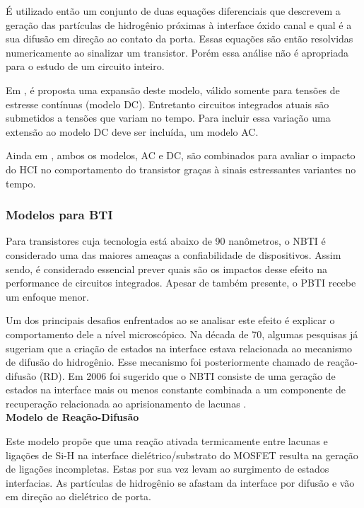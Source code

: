 É utilizado então um conjunto de duas equações diferenciais que descrevem a geração das partículas de hidrogênio próximas à interface óxido canal e qual é a sua difusão em direção ao contato da porta. Essas equações são então resolvidas numericamente ao sinalizar um transistor. Porém essa análise não é apropriada para o estudo de um circuito inteiro.

Em \cite{Maricau2013}, é proposta uma expansão deste modelo, válido somente para tensões de estresse contínuas (modelo DC). Entretanto circuitos integrados atuais são submetidos a tensões que variam no tempo. Para incluir essa variação uma extensão ao modelo DC deve ser incluída, um modelo AC. 

Ainda em \cite{Maricau2013}, ambos os modelos, AC e DC, são combinados para avaliar o impacto do HCI no comportamento do transistor graças à sinais estressantes variantes no tempo.

\subsubsection{Modelos para BTI}
\label{subsubsection_Modelos_BTI}

Para  transistores cuja tecnologia está abaixo de 90 nanômetros, o NBTI é considerado uma das maiores ameaças a confiabilidade de dispositivos. Assim sendo, é considerado essencial prever quais são os impactos desse efeito na performance de circuitos integrados. Apesar de também presente, o PBTI recebe um enfoque menor.

Um dos principais desafios enfrentados ao se analisar este efeito é explicar o comportamento dele a nível microscópico. Na década de 70, algumas pesquisas já sugeriam que a criação de estados na interface estava relacionada ao mecanismo de difusão do hidrogênio. Esse mecanismo foi posteriormente chamado de reação-difusão (RD). Em 2006 foi sugerido que o NBTI consiste de uma geração de estados na interface mais ou menos constante combinada a um componente de recuperação relacionada ao aprisionamento de lacunas \cite{Parthasarathy2006}.
\\

\textbf{Modelo de Reação-Difusão}

Este modelo propõe que uma reação ativada termicamente entre lacunas e ligações de Si-H na interface dielétrico/substrato do MOSFET resulta na geração de ligações incompletas. Estas por sua vez levam ao surgimento de estados interfacias. As partículas de hidrogênio se afastam da interface por difusão e vão em direção ao dielétrico de porta.

